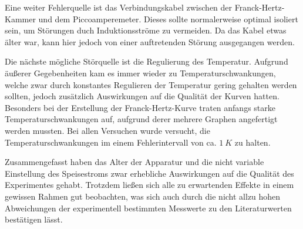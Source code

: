 Eine weiter Fehlerquelle ist das Verbindungskabel zwischen der Franck-Hertz-Kammer
und dem Piccoamperemeter. Dieses sollte normalerweise optimal isoliert sein, um
Störungen duch Induktionsströme zu vermeiden. Da das Kabel etwas älter war, kann
hier jedoch von einer auftretenden Störung ausgegangen werden.

Die nächste mögliche Störquelle ist die Regulierung des Temperatur. Aufgrund
äußerer Gegebenheiten kam es immer wieder zu Temperaturschwankungen, welche
zwar durch konstantes Regulieren der Temperatur gering gehalten werden sollten,
jedoch zusätzlich Auswirkungen auf die Qualität der Kurven hatten. Besonders bei
der Erstellung der Franck-Hertz-Kurve traten anfangs starke Temperaturschwankungen
auf, aufgrund derer mehrere Graphen angefertigt werden mussten. Bei allen Versuchen
wurde versucht, die Temperaturschwankungen im einem Fehlerintervall von ca. $\SI{1}{K}$
zu halten.

Zusammengefasst haben das Alter der Apparatur und die nicht variable Einstellung
des Speisestroms zwar erhebliche Auswirkungen auf die Qualität des Experimentes
gehabt. Trotzdem ließen sich alle zu erwartenden Effekte in einem gewissen
Rahmen gut beobachten, was sich auch durch die nicht allzu hohen Abweichungen
der experimentell bestimmten Messwerte zu den Literaturwerten bestätigen lässt.
